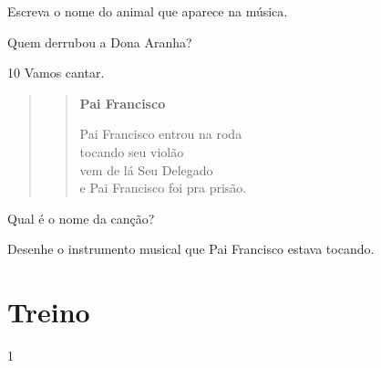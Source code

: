 \begin{escolha}
\item Escreva o nome do animal que aparece na música.


\pagebreak
\item Quem derrubou a Dona Aranha?


\end{escolha}

\num{10} Vamos cantar.

\begin{quote}
\begin{verse}
\textbf{Pai Francisco}

Pai Francisco entrou na roda\\
tocando seu violão\\
vem de lá Seu Delegado\\
e Pai Francisco foi pra prisão.
\end{verse}
\end{quote}


\begin{escolha}
\item Qual é o nome da canção?


\item Desenhe o instrumento musical que Pai Francisco estava tocando.

\begin{mdframed}[linewidth=2pt,linecolor=salmao,roundcorner=10pt]
\vspace{8cm}
\end{mdframed}
\end{escolha}

\section*{Treino}

\num{1}

